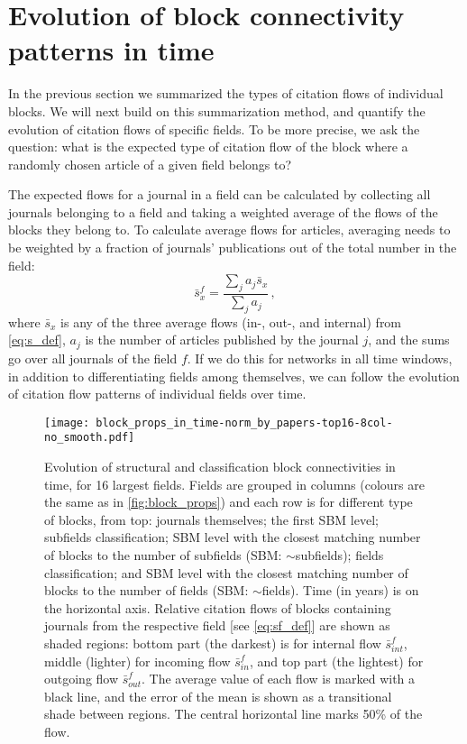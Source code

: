 \documentclass[a4paper,12pt]{article}
\begin{document}
\section{Evolution of block connectivity patterns in time}
\label{sec:evolution}

In the previous section we summarized the types of citation flows of
individual blocks.
We will next build on this summarization method, and
quantify the evolution of citation flows of specific fields.
To be more precise, we ask the question:
what is the expected type of citation flow of the block where a randomly chosen article of a given field belongs to?

The expected flows for a journal in a field can be calculated 
by collecting all journals belonging to a field and taking a weighted average of the flows of the blocks they belong to.
To calculate average flows for articles, averaging needs to be weighted by a
fraction of journals' publications out of the total number in the field:
\begin{equation}
  \bar{s}^{f}_x = \frac{\sum_{j} a_j \bar{s}_x}{\sum_{j}a_j}\,,
\label{eq:sf_def}
\end{equation}
where $\bar{s}_x$ is any of the three average flows (in-, out-, and internal) from 
\cref{eq:s_def}, $a_j$ is the number of articles published by the journal $j$, and 
the sums go over all journals of the field $f$. If we do this for networks in all time windows, in 
addition to differentiating fields among themselves, we can follow the evolution of citation flow patterns of 
individual fields over time.


\begin{figure}
  \centering
  \texttt{[image: block\_props\_in\_time-norm\_by\_papers-top16-8col-no\_smooth.pdf]}
  \caption{\small Evolution of structural and classification block connectivities in time, for 16 largest fields.
Fields are grouped in columns (colours are the same as in \protect\cref{fig:block_props})
and each row is for different type of blocks, from top:
journals themselves;
the first SBM level;
subfields classification;
SBM level with the closest matching number of blocks to the number of subfields (SBM: 
$\sim$subfields);
fields classification;
and SBM level with the closest matching number of blocks to the number of fields 
(SBM: $\sim$fields).
Time (in years) is on the horizontal axis.
Relative citation flows of blocks containing journals from the respective field 
[see \protect\cref{eq:sf_def}] are shown as shaded regions: bottom part (the darkest) is for 
internal flow $\bar{s}^{f}_{int}$, middle (lighter) for incoming flow $\bar{s}^{f}_{in}$, and top part (the lightest) for outgoing 
flow $\bar{s}^{f}_{out}$. The average value of each flow is marked with a black line, and the error of the mean is shown as 
a transitional shade between regions. The central horizontal line marks 50\% of the flow.
}
  \label{fig:block_props_in_time}
\end{figure}
\end{document}
